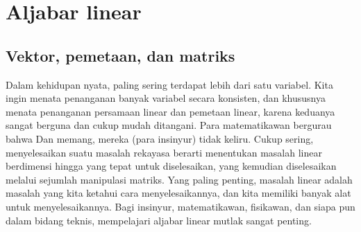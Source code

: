 \chapter{Aljabar linear} \label{linalg:appendix}


\section{Vektor, pemetaan, dan matriks}
\label{vecsandmaps:section}



Dalam kehidupan nyata, paling sering terdapat lebih dari satu variabel.
Kita ingin menata penanganan banyak variabel secara konsisten,
dan khususnya menata penanganan persamaan linear dan pemetaan
linear, karena keduanya sangat berguna dan cukup mudah ditangani.
Para matematikawan bergurau bahwa
Dan memang, mereka (para insinyur) tidak keliru.
Cukup sering, menyelesaikan suatu masalah rekayasa berarti menentukan
masalah linear berdimensi hingga yang tepat untuk diselesaikan, yang kemudian
diselesaikan melalui sejumlah manipulasi matriks.
Yang paling penting, masalah linear adalah masalah yang kita ketahui cara menyelesaikannya,
dan kita memiliki banyak alat untuk menyelesaikannya.
Bagi insinyur, matematikawan, fisikawan, dan siapa pun dalam bidang teknis,
mempelajari aljabar linear mutlak sangat penting.

